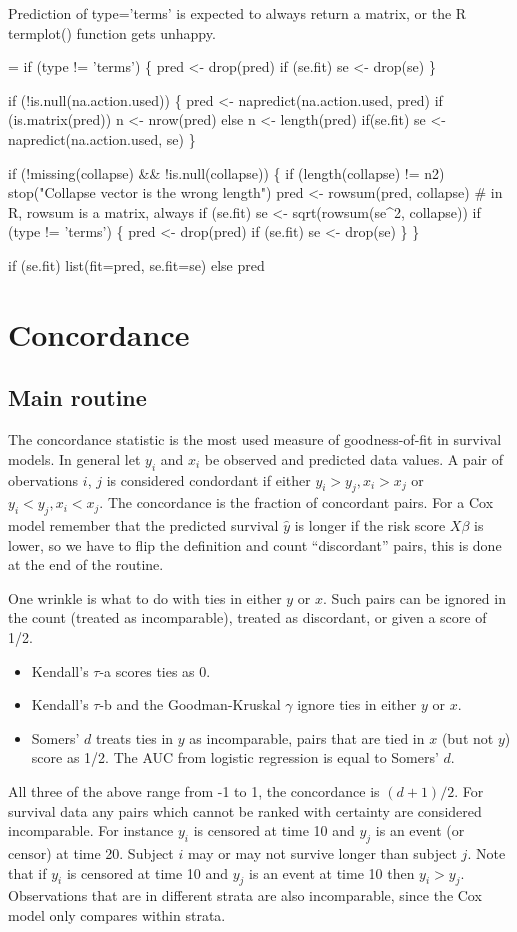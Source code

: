 \documentclass{article}
\begin{document}
Prediction of type='terms' is expected to always return a matrix, or
the R termplot() function gets unhappy.  
\begin{nwchunk}
=
 if (type != 'terms') \{
     pred <- drop(pred)
     if (se.fit) se <- drop(se)
     \}
 
 if (!is.null(na.action.used)) \{
     pred <- napredict(na.action.used, pred)
     if (is.matrix(pred)) n <- nrow(pred)
     else               n <- length(pred)
     if(se.fit) se <- napredict(na.action.used, se)
     \}
 
 if (!missing(collapse) && !is.null(collapse)) \{
     if (length(collapse) != n2) stop("Collapse vector is the wrong length")
     pred <- rowsum(pred, collapse)  # in R, rowsum is a matrix, always
     if (se.fit) se <- sqrt(rowsum(se^2, collapse))
     if (type != 'terms') \{
         pred <- drop(pred)
         if (se.fit) se <- drop(se)
         \}
     \}
 
 if (se.fit) list(fit=pred, se.fit=se)
 else pred
\end{nwchunk}
\section{Concordance}
\subsection{Main routine}
 The concordance statistic is the most used measure of goodness-of-fit
in survival models.  
In general let $y_i$ and $x_i$ be observed and predicted data values.
A pair of obervations $i$, $j$ is considered condordant if either
$y_i > y_j, x_i > x_j$ or $y_i < y_j, x_i < x_j$.
The concordance is the fraction of concordant pairs.
For a Cox model remember that the predicted survival $\hat y$ is longer if
the risk score $X\beta$ is lower, so we have to flip the definition and
count ``discordant'' pairs, this is done at the end of the routine.

One wrinkle is what to do with ties in either $y$ or $x$.  Such pairs
can be ignored in the count (treated as incomparable), treated as discordant,
or given a score of 1/2.
\begin{itemize}
  \item Kendall's $\tau$-a scores ties as 0.
  \item Kendall's $\tau$-b and the Goodman-Kruskal $\gamma$ ignore ties in 
    either $y$ or $x$.
  \item Somers' $d$ treats ties in $y$ as incomparable, pairs that are tied
    in $x$ (but not $y$) score as 1/2.  The AUC from logistic regression is
    equal to Somers' $d$.
\end{itemize}
All three of the above range from -1 to 1, the concordance is
$(d +1)/2$.  
For survival data any pairs which cannot be ranked with certainty are
considered incomparable.
For instance $y_i$ is censored at time 10 and $y_j$ is an event (or censor) 
at time 20.  Subject $i$ may or may not survive longer than subject $j$.  
Note that if $y_i$ is censored at time
10 and $y_j$ is an event at time 10 then $y_i > y_j$.  
Observations that are in different strata are also incomparable, 
since the Cox model only compares within strata.
\end{document}
